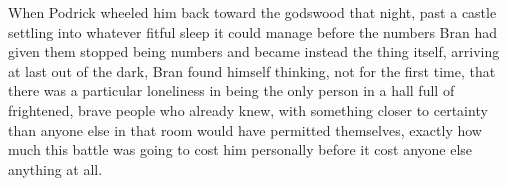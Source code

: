 When Podrick wheeled him back toward the godswood that night, past a castle settling into whatever fitful sleep it could manage before the numbers Bran had given them stopped being numbers and became instead the thing itself, arriving at last out of the dark, Bran found himself thinking, not for the first time, that there was a particular loneliness in being the only person in a hall full of frightened, brave people who already knew, with something closer to certainty than anyone else in that room would have permitted themselves, exactly how much this battle was going to cost him personally before it cost anyone else anything at all.